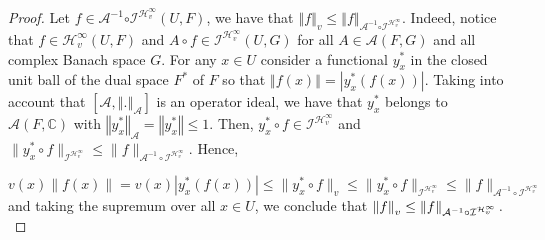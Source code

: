 \documentclass[10pt,a4paper]{amsart}
\begin{document}
\begin{proof}
Let $f\in \mathcal{A}^{-1}\mathcal{\circ I}^{\mathcal{H}_{v}^{\infty
}}\left( U,F\right) $, we have that $\left\Vert f\right\Vert _{v}\leq
\left\Vert f\right\Vert _{\mathcal{A}^{-1}\mathcal{\circ I}^{\mathcal{H}%
_{v}^{\infty }}}$. Indeed, notice that $f\in \mathcal{H}_{v}^{\infty }\left(
U,F\right) $ and $A\circ f\in \mathcal{I}^{\mathcal{H}_{v}^{\infty }}\left(
U,G\right) $ for all $A\in \mathcal{A}\left( F,G\right) $ and all 
complex Banach space $G$. For any $x\in U$ consider a functional $y^{\ast }_x$ in the closed unit ball of the dual space $F^{\ast }$ of $F$ so that $\left\Vert
f\left( x\right) \right\Vert =\left\vert y^{\ast }_x\left( f\left( x\right)
\right) \right\vert $. Taking into account that $\left[ \mathcal{A}%
,\left\Vert .\right\Vert _{\mathcal{A}}\right] $ is an operator ideal,
we have that  $y^{\ast }_x$ belongs to $\mathcal{A}\left( F,\mathbb{C}\right) $
with $\left\Vert y^{\ast }_x\right\Vert _{\mathcal{A}}=\left\Vert
y^{\ast }_x\right\Vert \leq 1$. Then, $y^*_x\circ f\in \mathcal{ I}^{\mathcal{H}_{v}^{\infty
}}$ and $\|y_x^{\ast}\circ f\|_{\mathcal I^{\mathcal H_v^\infty}}\leq \|f\|_{\mathcal A^{-1}\circ \mathcal I^{\mathcal H_v^\infty}}$. Hence, 

$$
v(x)\|f(x)\|=v(x)|y_x^*(f(x))|\leq \|y_x^*\circ f\|_v\leq \|y_x^*\circ f\|_{\mathcal I^{\mathcal H_v^\infty}}\leq \|f\|_{\mathcal A^{-1}\circ \mathcal I^{\mathcal H_v^\infty}}
$$
and taking the supremum over all $x\in U$, we conclude that $\left\Vert
f\right\Vert _{v}\leq \left\Vert f\right\Vert _{\mathcal{A}^{-1}\mathcal{%
\circ I}^{\mathcal{H}_{v}^{\infty }}}.$


\end{proof}
\end{document}
